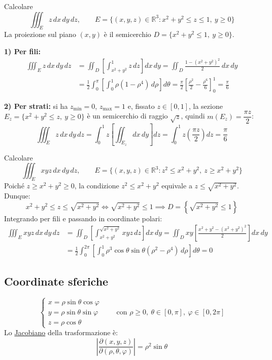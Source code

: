 \begin{esercizio}[EXE 1]
Calcolare
\[
\iiint_E z\, dx\, dy\, dz, \qquad E = \{ (x, y, z) \in \mathbb{R}^3 : x^2 + y^2 \le z \le 1, \ y \ge 0 \}
\]
La proiezione sul piano $(x, y)$ è il semicerchio $D = \{ x^2 + y^2 \le 1, \ y \ge 0 \}$.

\textbf{1) Per fili:}
\begin{align*}
\iiint_E z\, dx\, dy\, dz
&= \iint_D \left[ \int_{x^2 + y^2}^1 z\, dz \right] dx\, dy
= \iint_D \frac{1 - (x^2 + y^2)^2}{2}\, dx\, dy \\
&= \frac{1}{2} \int_0^\pi \left[ \int_0^1 \rho (1 - \rho^4)\, d\rho \right] d\theta
= \frac{\pi}{2} \left[ \frac{\rho^2}{2} - \frac{\rho^6}{6} \right]_0^1
= \frac{\pi}{6}
\end{align*}

\textbf{2) Per strati:} si ha $z_{\min} = 0$, $z_{\max} = 1$ e, fissato $z \in [0, 1]$, la sezione $E_z = \{ x^2 + y^2 \le z, \ y \ge 0 \}$ è un semicerchio di raggio $\sqrt{z}$, quindi $m(E_z) = \dfrac{\pi z}{2}$:
\[
\iiint_E z\, dx\, dy\, dz
= \int_0^1 z \left[ \iint_{E_z} dx\, dy \right] dz
= \int_0^1 z \left( \frac{\pi z}{2} \right) dz
= \frac{\pi}{6}
\]
\end{esercizio}

\begin{esercizio}[EXE 2]
Calcolare
\[
\iiint_E x y z\, dx\, dy\, dz, \qquad E = \{ (x, y, z) \in \mathbb{R}^3 : z^2 \le x^2 + y^2, \ z \ge x^2 + y^2 \}
\]
Poiché $z \ge x^2 + y^2 \ge 0$, la condizione $z^2 \le x^2 + y^2$ equivale a $z \le \sqrt{x^2 + y^2}$. Dunque:
\[
x^2 + y^2 \le z \le \sqrt{x^2 + y^2} \iff \sqrt{x^2 + y^2} \le 1 \implies D = \left\{ \sqrt{x^2 + y^2} \le 1 \right\}
\]
Integrando per fili e passando in coordinate polari:
\begin{align*}
\iiint_E x y z\, dx\, dy\, dz
&= \iint_D \left[ \int_{x^2 + y^2}^{\sqrt{x^2 + y^2}} x y z\, dz \right] dx\, dy
= \iint_D x y \left[ \frac{x^2 + y^2 - (x^2 + y^2)^2}{2} \right] dx\, dy \\
&= \frac{1}{2} \int_0^{2\pi} \left[ \int_0^1 \rho^3 \cos\theta \sin\theta (\rho^2 - \rho^4)\, d\rho \right] d\theta
= 0
\end{align*}
\end{esercizio}

\subsection{Coordinate sferiche}

\[
\begin{cases}
x = \rho \sin\theta \cos\varphi \\
y = \rho \sin\theta \sin\varphi \\
z = \rho \cos\theta
\end{cases}
\qquad \text{con } \rho \ge 0, \ \theta \in [0, \pi], \ \varphi \in [0, 2\pi]
\]
Lo \underline{Jacobiano} della trasformazione è:
\[
\left| \frac{\partial(x, y, z)}{\partial(\rho, \theta, \varphi)} \right| = \rho^2 \sin\theta
\]

